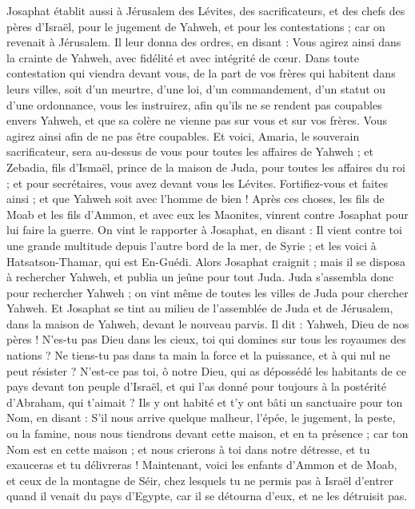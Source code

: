 \begin{multicols}{2}
Josaphat établit aussi à Jérusalem des Lévites, des sacrificateurs, et des chefs des pères d'Israël, pour le jugement de Yahweh, et pour les contestations ; car on revenait à Jérusalem.
Il leur donna des ordres, en disant : Vous agirez ainsi dans la crainte de Yahweh, avec fidélité et avec intégrité de cœur.
Dans toute contestation qui viendra devant vous, de la part de vos frères qui habitent dans leurs villes, soit d'un meurtre, d'une loi, d'un commandement, d’un statut ou d'une ordonnance, vous les instruirez, afin qu'ils ne se rendent pas coupables envers Yahweh, et que sa colère ne vienne pas sur vous et sur vos frères. Vous agirez ainsi afin de ne pas être coupables.
Et voici, Amaria, le souverain sacrificateur, sera au-dessus de vous pour toutes les affaires de Yahweh ; et Zebadia, fils d'Ismaël, prince de la maison de Juda, pour toutes les affaires du roi ; et pour secrétaires, vous avez devant vous les Lévites. Fortifiez-vous et faites ainsi ; et que Yahweh soit avec l'homme de bien !
\VerseOne{}Après ces choses, les fils de Moab et les fils d'Ammon, et avec eux les Maonites, vinrent contre Josaphat pour lui faire la guerre.
On vint le rapporter à Josaphat, en disant : Il vient contre toi une grande multitude depuis l’autre bord de la mer, de Syrie ; et les voici à Hatsatson-Thamar, qui est En-Guédi.
Alors Josaphat craignit ; mais il se disposa à rechercher Yahweh, et publia un jeûne pour tout Juda.
Juda s'assembla donc pour rechercher Yahweh ; on vint même de toutes les villes de Juda pour chercher Yahweh.
Et Josaphat se tint au milieu de l'assemblée de Juda et de Jérusalem, dans la maison de Yahweh, devant le nouveau parvis.
Il dit : Yahweh, Dieu de nos pères ! N’es-tu pas Dieu dans les cieux, toi qui domines sur tous les royaumes des nations ? Ne tiens-tu pas dans ta main la force et la puissance, et à qui nul ne peut résister ?
N'est-ce pas toi, ô notre Dieu, qui as dépossédé les habitants de ce pays devant ton peuple d'Israël, et qui l'as donné pour toujours à la postérité d'Abraham, qui t'aimait ?
Ils y ont habité et t'y ont bâti un sanctuaire pour ton Nom, en disant :
S'il nous arrive quelque malheur, l'épée, le jugement, la peste, ou la famine, nous nous tiendrons devant cette maison, et en ta présence ; car ton Nom est en cette maison ; et nous crierons à toi dans notre détresse, et tu exauceras et tu délivreras !
Maintenant, voici les enfants d'Ammon et de Moab, et ceux de la montagne de Séir, chez lesquels tu ne permis pas à Israël d'entrer quand il venait du pays d'Egypte, car il se détourna d'eux, et ne les détruisit pas.

\end{multicols}
